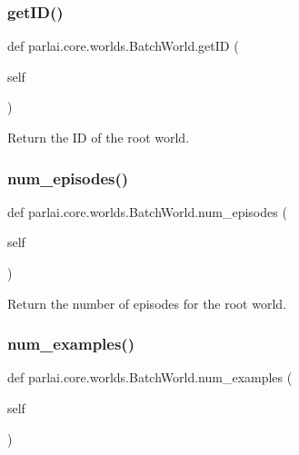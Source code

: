 \subsubsection{\texorpdfstring{get\+I\+D()}{getID()}}
{\footnotesize\ttfamily def parlai.\+core.\+worlds.\+Batch\+World.\+get\+ID (\begin{DoxyParamCaption}\item[{}]{self }\end{DoxyParamCaption})}

\begin{DoxyVerb}Return the ID of the root world.
\end{DoxyVerb}
 \mbox{\label{classparlai_1_1core_1_1worlds_1_1BatchWorld_ae3f96cd2de72eb0f333cb29bbf74177b}} 
\subsubsection{\texorpdfstring{num\+\_\+episodes()}{num\_episodes()}}
{\footnotesize\ttfamily def parlai.\+core.\+worlds.\+Batch\+World.\+num\+\_\+episodes (\begin{DoxyParamCaption}\item[{}]{self }\end{DoxyParamCaption})}

\begin{DoxyVerb}Return the number of episodes for the root world.
\end{DoxyVerb}
 \mbox{\label{classparlai_1_1core_1_1worlds_1_1BatchWorld_a047736ed3867bf7631af02f8eb0528d8}} 
\subsubsection{\texorpdfstring{num\+\_\+examples()}{num\_examples()}}
{\footnotesize\ttfamily def parlai.\+core.\+worlds.\+Batch\+World.\+num\+\_\+examples (\begin{DoxyParamCaption}\item[{}]{self }\end{DoxyParamCaption})}


